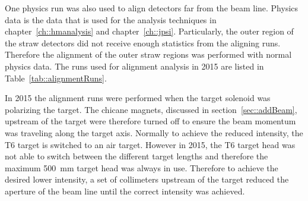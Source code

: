 One physics run was also used to align detectors far from the beam line.
Physics data is the data that is used for the analysis techniques in
chapter~\ref{ch::hmanalysis} and chapter~\ref{ch::jpsi}.  Particularly, the
outer region of the straw detectors did not receive enough statistics from the
aligning runs.  Therefore the alignment of the outer straw regions was performed
with normal physics data.  The runs used for alignment analysis in 2015 are
listed in Table~\ref{tab::alignmentRuns}.

In 2015 the alignment runs were performed when the target solenoid was
polarizing the target.  The chicane magnets, discussed in
section~\ref{sec::addBeam}, upstream of the target were therefore turned off to
ensure the beam momentum was traveling along the target axis.  Normally to
achieve the reduced intensity, the T6 target is switched to an air target.
However in 2015, the T6 target head was not able to switch between the different
target lengths and therefore the maximum 500~mm target head was always in use.
Therefore to achieve the desired lower intensity, a set of collimeters upstream
of the target reduced the aperture of the beam line until the correct intensity
was achieved.

